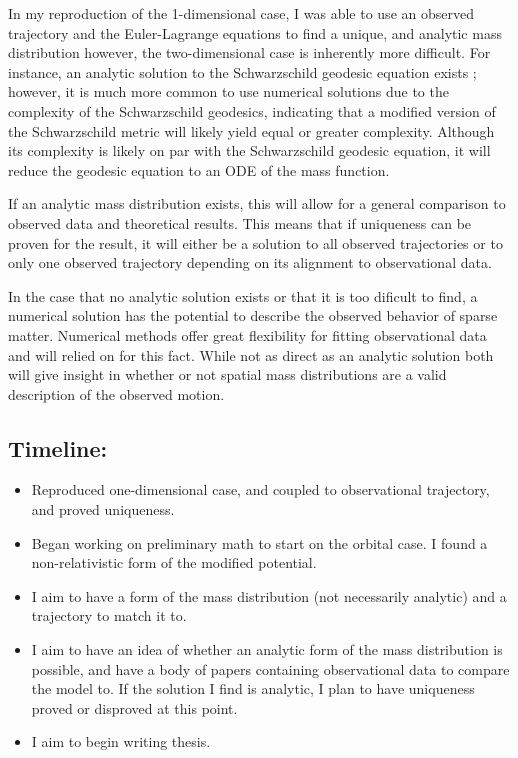 \documentclass{article}
\let\cite\parencite
\begin{document}
In my reproduction of the 1-dimensional case, I was able to use an observed trajectory and the Euler-Lagrange equations to find a unique, and analytic mass distribution however, the two-dimensional case is inherently more difficult. For instance, an analytic solution to the Schwarzschild geodesic equation exists \cite{hackmannCompleteAnalyticSolution2008}; however, it is much more common to use numerical solutions due to the complexity of the Schwarzschild geodesics, indicating that a modified version of the Schwarzschild metric will likely yield equal or greater complexity. Although its complexity is likely on par with the Schwarzschild geodesic equation, it will reduce the geodesic equation to an ODE of the mass function. 

If an analytic mass distribution exists, this will allow for a general comparison to observed data and theoretical results. This means that if uniqueness can be proven for the result, it will either be a solution to all observed trajectories or to only one observed trajectory depending on its alignment to observational data.

In the case that no analytic solution exists or that it is too dificult to find, a numerical solution has the potential to describe the observed behavior of sparse matter. Numerical methods offer great flexibility for fitting observational data and will relied on for this fact. While not as direct as an analytic solution both will give insight in whether or not spatial mass distributions are a valid description of the observed motion.


\subsection*{Timeline:}
\begin{itemize}
    \item[\textbf{November-February:}]  Reproduced one-dimensional case, and coupled to observational trajectory, and proved uniqueness.
    \item[\textbf{March-April:}] Began working on preliminary math to start on the orbital case. I found a non-relativistic form of the modified potential. 
    \item[\textbf{May:}] I aim to have a form of the mass distribution (not necessarily analytic) and a trajectory to match it to.
    \item[\textbf{June-July:}]  I aim to have an idea of whether an analytic form of the mass distribution is possible, and have a body of papers containing observational data to compare the model to. If the solution I find is analytic, I plan to have uniqueness proved or disproved at this point.
    \item[\textbf{August:}] I aim to begin writing thesis.
\end{itemize}
\sloppy

\nocite{*}
\printbibheading
\printbibliography[category=cited,heading=subbibliography,title={Cited material}]
\printbibliography[title={Supplementary material},heading=subbibliography,notcategory=cited]
\end{document}
